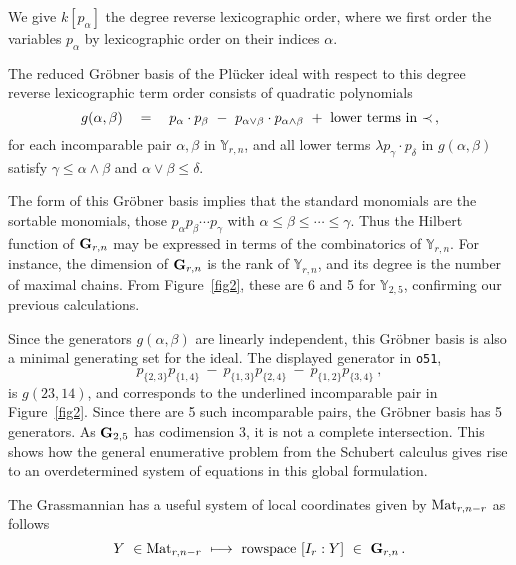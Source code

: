 We give $k[p_\alpha]$ the degree reverse
lexicographic order, where we first order the variables $p_\alpha$ by
lexicographic order on their indices $\alpha$.

\begin{theorem}\label{PluckerIdeal}
The reduced Gr\"obner basis of the Pl\"ucker
ideal with respect to this degree 
reverse lexicographic term order consists of quadratic
polynomials 
$$
  g(\alpha,\beta)\quad=\quad
  p_\alpha\cdot p_\beta \ -\  p_{\alpha\vee\beta}\cdot p_{\alpha\wedge\beta} 
  \ +\ \hbox{lower terms in $\prec$}\,,
$$
for each incomparable pair $\alpha,\beta$ in
${\mathbb Y}_{r,n}$,
and all lower terms $\lambda p_\gamma\cdot p_\delta$ in $g(\alpha,\beta)$
satisfy $\gamma\leq \alpha\wedge\beta$ and $\alpha\vee\beta\leq \delta$.
\end{theorem}

The form of this Gr\"obner basis implies that the standard monomials are 
the sortable monomials, those $p_\alpha p_\beta\cdots p_\gamma$ with 
$\alpha\leq\beta\leq\cdots\leq\gamma$.
Thus the Hilbert function of ${\bf G}_{r,n}$ may be
expressed in terms of the combinatorics of ${\mathbb Y}_{r,n}$.
For instance, the dimension of ${\bf G}_{r,n}$ is the rank of 
${\mathbb Y}_{r,n}$, and its degree is the number of maximal chains.
From Figure~\ref{fig2}, these are 6 and 5 for ${\mathbb Y}_{2,5}$,
confirming our previous calculations.

Since the generators $g(\alpha,\beta)$ are linearly independent, this
Gr\"obner basis is also a minimal generating set for the ideal.
The displayed generator in {\tt o51}, 
$$
  p_{\{2,3\}}p_{\{1,4\}}\ -\ p_{\{1,3\}}p_{\{2,4\}}\ -\
  p_{\{1,2\}}p_{\{3,4\}}\ ,
$$
is $g(23, 14)$, and corresponds to the underlined incomparable pair in
Figure~\ref{fig2}. 
Since there are 5 such incomparable pairs, the Gr\"obner basis has 5
generators.
As ${\bf G}_{2,5}$ has codimension 3, it is not a complete
intersection. 
This shows how the general enumerative problem from the Schubert calculus
gives rise to an overdetermined system of equations\index{polynomial
equations!overdetermined} in this global 
formulation. 
\medskip

The Grassmannian has a useful system of
local coordinates given by ${\rm Mat}_{r,n-r}$ as follows
%
\begin{equation}\label{eq:local}
  Y\ \in {\rm Mat}_{r,n-r}\ \longmapsto\ 
  {\rm row space}\ [ I_r : Y ]\ \in\ {\bf G}_{r,n}\,.
\end{equation}
%

